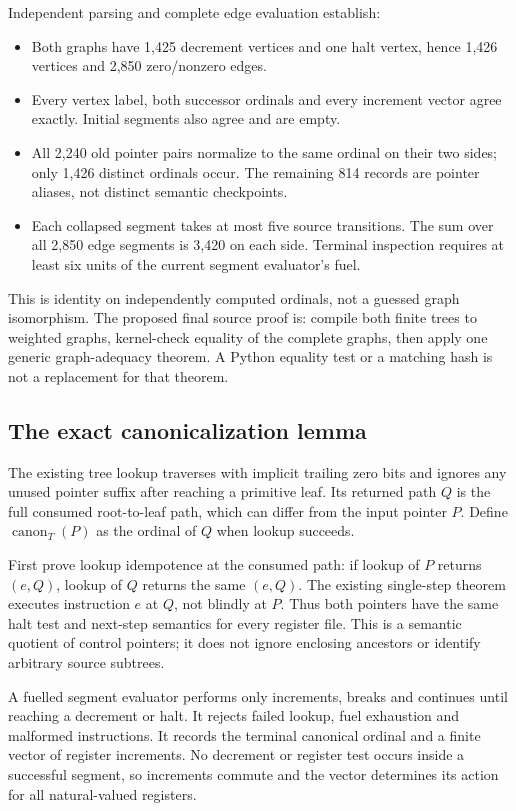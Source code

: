 \documentclass[11pt]{article}
\begin{document}
Independent parsing and complete edge evaluation establish:
\begin{itemize}
\item Both graphs have 1,425 decrement vertices and one halt vertex, hence 1,426 vertices and 2,850 zero/nonzero edges.
\item Every vertex label, both successor ordinals and every increment vector agree exactly. Initial segments also agree and are empty.
\item All 2,240 old pointer pairs normalize to the same ordinal on their two sides; only 1,426 distinct ordinals occur. The remaining 814 records are pointer aliases, not distinct semantic checkpoints.
\item Each collapsed segment takes at most five source transitions. The sum over all 2,850 edge segments is 3,420 on each side. Terminal inspection requires at least six units of the current segment evaluator's fuel.
\end{itemize}
This is identity on independently computed ordinals, not a guessed graph isomorphism. The proposed final source proof is: compile both finite trees to weighted graphs, kernel-check equality of the complete graphs, then apply one generic graph-adequacy theorem. A Python equality test or a matching hash is not a replacement for that theorem.

\subsection{The exact canonicalization lemma}
The existing tree lookup traverses with implicit trailing zero bits and ignores any unused pointer suffix after reaching a primitive leaf. Its returned path $Q$ is the full consumed root-to-leaf path, which can differ from the input pointer $P$. Define $\operatorname{canon}_T(P)$ as the ordinal of $Q$ when lookup succeeds.

First prove lookup idempotence at the consumed path: if lookup of $P$ returns $(e,Q)$, lookup of $Q$ returns the same $(e,Q)$. The existing single-step theorem executes instruction $e$ at $Q$, not blindly at $P$. Thus both pointers have the same halt test and next-step semantics for every register file. This is a semantic quotient of control pointers; it does not ignore enclosing ancestors or identify arbitrary source subtrees.

A fuelled segment evaluator performs only increments, breaks and continues until reaching a decrement or halt. It rejects failed lookup, fuel exhaustion and malformed instructions. It records the terminal canonical ordinal and a finite vector of register increments. No decrement or register test occurs inside a successful segment, so increments commute and the vector determines its action for all natural-valued registers.
\end{document}
